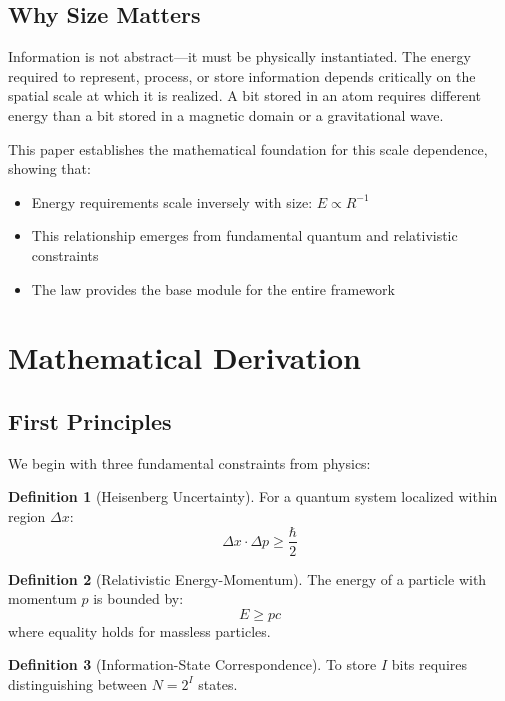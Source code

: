 \documentclass[11pt,a4paper]{article}
\theoremstyle{definition}
\newtheorem{definition}{Definition}[section]
\begin{document}
\subsection{Why Size Matters}

Information is not abstract—it must be physically instantiated. The energy required to represent, process, or store information depends critically on the spatial scale at which it is realized. A bit stored in an atom requires different energy than a bit stored in a magnetic domain or a gravitational wave.

This paper establishes the mathematical foundation for this scale dependence, showing that:
\begin{itemize}
\item Energy requirements scale inversely with size: $E \propto R^{-1}$
\item This relationship emerges from fundamental quantum and relativistic constraints
\item The law provides the base module for the entire framework
\end{itemize}

\section{Mathematical Derivation}

\subsection{First Principles}

We begin with three fundamental constraints from physics:

\begin{definition}[Heisenberg Uncertainty]
For a quantum system localized within region $\Delta x$:
\begin{equation}
\Delta x \cdot \Delta p \geq \frac{\hbar}{2}
\end{equation}
\end{definition}

\begin{definition}[Relativistic Energy-Momentum]
The energy of a particle with momentum $p$ is bounded by:
\begin{equation}
E \geq pc
\end{equation}
where equality holds for massless particles.
\end{definition}

\begin{definition}[Information-State Correspondence]
To store $I$ bits requires distinguishing between $N = 2^I$ states.
\end{definition}
\end{document}

